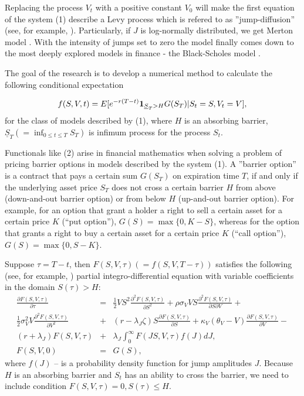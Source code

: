 \documentclass[a4paper]{jpconf}
\begin{document}
Replacing the process $V_t$ with a positive constant $V_0$ will make the first equation of the system (1) describe a Levy process which is refered to as ''jump-diffusion'' (see, for example, \cite{cont_tankov}). Particularly, if $J$ is log-normally distributed, we get Merton model \cite{merton}. With the intensity of jumps set to zero the model finally comes down to the most deeply explored models in finance - the Black-Scholes model \cite{b_s}.

The goal of the research is to develop a numerical method to calculate the following conditional expectation

\begin{equation}
f(S,V,t) = E[e^{-r(T-t)}  {\bf 1}_{\underline{S}_T>H} G(S_T) | S_t = S, V_t = V],
\end{equation}
for the class of models described by (1), where $H$ is an absorbing barrier, $\underline{S}_T (= \inf_{0\le t\le T}S_T)$ is infimum process for the process $S_t$. 

Functionals like (2) arise in financial mathematics when solving a problem of pricing barrier options in models described by the system (1).
A ''barrier option'' is a contract that pays a certain sum $G(S_T)$ on expiration time $T$, if and only if the underlying asset price $S_T$ does not cross a certain barrier $H$ from above (down-and-out barrier option) or from below $H$ (up-and-out barrier option). For example, for an option that grant a holder a right to sell a certain asset for a certain price $K$ (``put option''), $G(S)=\max\{0, K - S\}$, whereas for the option that grants a right to buy a certain asset for a certain price $K$ (``call option''), $G(S)=\max\{0, S - K\}$.

Suppose $\tau = T-t$, then $F(S,V,\tau)\left(=f(S,V, T-\tau)\right)$ satisfies the following (see, for example, \cite{feng}) partial integro-differential equation with variable coefficients in the domain $S(\tau) > H$:
\begin{eqnarray*}
	\frac{\partial F(S,V,\tau)}{\partial \tau} &= &
	\frac{1}{2} VS^2 \frac{\partial^2 F(S,V,\tau)}{\partial S^2} +
	\rho\sigma_V VS \frac{\partial^2 F(S,V,\tau)}{\partial S \partial V} +
	\\
	\frac{1}{2} \sigma_V^2 V \frac{\partial^2 F(S,V,\tau)}{\partial V^2} &+&
	(r - \lambda_J \zeta) S \frac{\partial F(S,V,\tau)}{\partial S} +
	\kappa_V(\theta_V - V) \frac{\partial F(S,V,\tau)}{\partial V} - 
	\\
	(r+\lambda_J)F(S,V,\tau) &+&
	\lambda_J \int_0^\infty F(JS,V,\tau) f(J) dJ,
	\\
	F(S,V,0) &=& G(S),
\end{eqnarray*}
where $f(J)$ -- is a probability density function for jump amplitudes $J$. Because $H$ is an absorbing barrier and $S_t$ has an ability to cross the barrier, we need to include condition $F(S,V,\tau) = 0,  S(\tau) \le H$.
\end{document}
